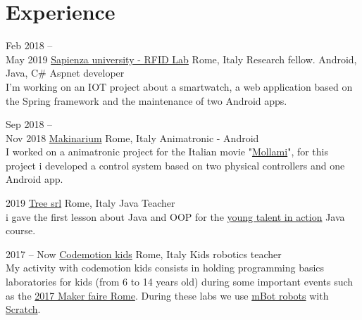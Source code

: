 \documentclass[]{friggeri-cv} %
\begin{document}

\section{Experience}

\begin{entrylist}


\entry
{Feb 2018 --\\ May 2019}
{\href{http://rfidlab.di.uniroma1.it/}{Sapienza university - RFID Lab}}
{Rome, Italy}
{Research fellow. Android, Java, C\# Aspnet developer\\
I'm working on an IOT project about a smartwatch, a web application based on the Spring framework and the maintenance of two Android apps.}


\entry
{Sep 2018 --\\ Nov 2018}
{\href{https://www.makinarium.it/}{Makinarium}}
{Rome, Italy}
{Animatronic - Android\\
	I worked on a animatronic project for the Italian movie "{\href{https://www.imdb.com/title/tt9269662/fullcredits?ref_=tt_cl_sm#cast}{Mollami}}", for this project i developed a control system based on two physical controllers and one Android app.}

\entry
{2019}
{\href{https://tree.it/}{Tree srl}}
{Rome, Italy}
{Java Teacher\\
	i gave the first lesson about Java and OOP for the \href{https://ytia.it/}{young talent in action} Java course.} 


\entry
{2017 -- Now}
{\href{https://codemotionkids.com/}{Codemotion kids}}
{Rome, Italy}
{Kids robotics teacher\\
My activity with codemotion kids consists in holding programming basics laboratories for kids (from 6 to 14 years old) during some important events such as the \href{http://www.rainews.it/dl/rainews/media/Maker-Faire-giovani-inventori-presentano-progetti-innovativi-i-bimbi-vanno-su-Marte-d40b391c-1db8-4a57-85d2-63dc5feb860b.html}{2017 Maker faire Rome}. During these labs we use  \href{https://www.makeblock.com/steam-kits/mbot}{mBot robots} with \href{https://scratch.mit.edu/}{Scratch}. 
}


\end{entrylist}
\end{document}
